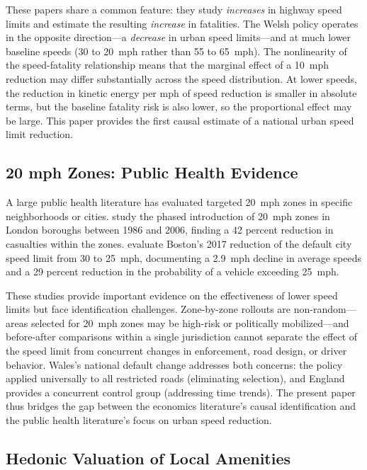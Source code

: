 \documentclass[12pt]{article}
\begin{document}
These papers share a common feature: they study \textit{increases} in highway speed limits and estimate the resulting \textit{increase} in fatalities. The Welsh policy operates in the opposite direction---a \textit{decrease} in urban speed limits---and at much lower baseline speeds (30 to 20~mph rather than 55 to 65~mph). The nonlinearity of the speed-fatality relationship \citep{elvik2009, nilsson2004} means that the marginal effect of a 10~mph reduction may differ substantially across the speed distribution. At lower speeds, the reduction in kinetic energy per mph of speed reduction is smaller in absolute terms, but the baseline fatality risk is also lower, so the proportional effect may be large. This paper provides the first causal estimate of a national urban speed limit reduction.

\subsection{20 mph Zones: Public Health Evidence}

A large public health literature has evaluated targeted 20~mph zones in specific neighborhoods or cities. \citet{grundy2009} study the phased introduction of 20~mph zones in London boroughs between 1986 and 2006, finding a 42 percent reduction in casualties within the zones. \citet{hu2017} evaluate Boston's 2017 reduction of the default city speed limit from 30 to 25~mph, documenting a 2.9~mph decline in average speeds and a 29 percent reduction in the probability of a vehicle exceeding 25~mph.

These studies provide important evidence on the effectiveness of lower speed limits but face identification challenges. Zone-by-zone rollouts are non-random---areas selected for 20~mph zones may be high-risk or politically mobilized---and before-after comparisons within a single jurisdiction cannot separate the effect of the speed limit from concurrent changes in enforcement, road design, or driver behavior. Wales's national default change addresses both concerns: the policy applied universally to all restricted roads (eliminating selection), and England provides a concurrent control group (addressing time trends). The present paper thus bridges the gap between the economics literature's causal identification and the public health literature's focus on urban speed reduction.

\subsection{Hedonic Valuation of Local Amenities}
\end{document}
